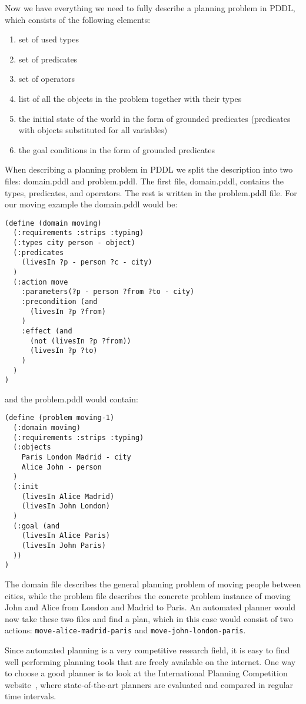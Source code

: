 \documentclass[runningheads]{llncs}
\begin{document}
Now we have everything we need to fully describe a planning problem in PDDL, which consists of the following
elements:
\begin{enumerate}
\item set of used types
\item set of predicates
\item set of operators
\item list of all the objects in the problem together with their types
\item the initial state of the world in the form of grounded predicates (predicates with objects substituted for
all variables)
\item the goal conditions in the form of grounded predicates
\end{enumerate}

When describing a planning problem in PDDL we split the description into two files: domain.pddl and problem.pddl.
The first file, domain.pddl, contains the types, predicates, and operators. The rest is written in the problem.pddl
file. For our moving example the domain.pddl would be:

\begin{verbatim}
(define (domain moving)
  (:requirements :strips :typing)
  (:types city person - object)
  (:predicates
    (livesIn ?p - person ?c - city)
  )
  (:action move
    :parameters(?p - person ?from ?to - city)
    :precondition (and
      (livesIn ?p ?from)
    )
    :effect (and
      (not (livesIn ?p ?from))
      (livesIn ?p ?to)
    )
  )
)
\end{verbatim}
and the problem.pddl would contain:
\begin{verbatim}
(define (problem moving-1)
  (:domain moving)
  (:requirements :strips :typing)
  (:objects
    Paris London Madrid - city
    Alice John - person
  )
  (:init
    (livesIn Alice Madrid)
    (livesIn John London)
  )
  (:goal (and
    (livesIn Alice Paris)
    (livesIn John Paris)
  ))
)
\end{verbatim}
The domain file describes the general planning problem of moving people between cities, while the problem
file describes the concrete problem instance of moving John and Alice from London and Madrid to Paris.
An automated planner would now take these two files and find a plan, which in this case would consist of two
actions: \verb _move-alice-madrid-paris_ and \verb _move-john-london-paris_.

Since automated planning is a very competitive research field, it is easy to find well performing
planning tools that are freely available on the internet. One way to choose a good planner is to look
at the International Planning Competition website~\cite{ipc}, where state-of-the-art planners are evaluated
and compared in regular time intervals.
\end{document}
